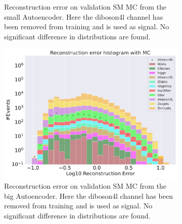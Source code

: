 \begin{figure}[h!]
\begin{subfigure}{.45\textwidth}
        \caption{Reconstruction error on validation SM MC from the small Autoencoder. Here the diboson4l channel has been removed from training and 
        is used as signal. No significant difference in distributions are found. }
        \label{fig:vae_small_diboson4l}
    \end{subfigure}
    \hfill 
    \begin{subfigure}{.45\textwidth}
        \includegraphics[width=\textwidth]{Figures/VAE_testing/big/b_data_recon_big_rm3_feats_sig_diboson4l.pdf}
        \caption{Reconstruction error on validation SM MC from the big Autoencoder. Here the diboson4l channel has been removed from training and 
        is used as signal. No significant difference in distributions are found. }
        \label{fig:vae_big_diboson4l}
    \end{subfigure}
    \hfill  
    \caption{ }
    \label{fig:vae_big_channel3}
\end{figure}


